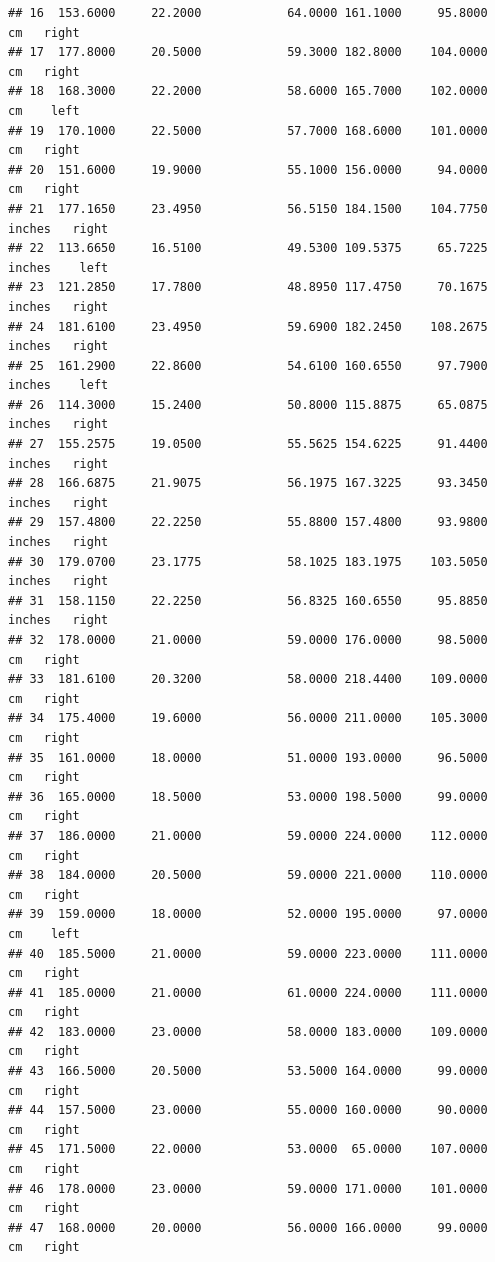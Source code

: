 \documentclass[]{article}
\begin{document}
\begin{verbatim}
## 16  153.6000     22.2000            64.0000 161.1000     95.8000     cm   right
## 17  177.8000     20.5000            59.3000 182.8000    104.0000     cm   right
## 18  168.3000     22.2000            58.6000 165.7000    102.0000     cm    left
## 19  170.1000     22.5000            57.7000 168.6000    101.0000     cm   right
## 20  151.6000     19.9000            55.1000 156.0000     94.0000     cm   right
## 21  177.1650     23.4950            56.5150 184.1500    104.7750 inches   right
## 22  113.6650     16.5100            49.5300 109.5375     65.7225 inches    left
## 23  121.2850     17.7800            48.8950 117.4750     70.1675 inches   right
## 24  181.6100     23.4950            59.6900 182.2450    108.2675 inches   right
## 25  161.2900     22.8600            54.6100 160.6550     97.7900 inches    left
## 26  114.3000     15.2400            50.8000 115.8875     65.0875 inches   right
## 27  155.2575     19.0500            55.5625 154.6225     91.4400 inches   right
## 28  166.6875     21.9075            56.1975 167.3225     93.3450 inches   right
## 29  157.4800     22.2250            55.8800 157.4800     93.9800 inches   right
## 30  179.0700     23.1775            58.1025 183.1975    103.5050 inches   right
## 31  158.1150     22.2250            56.8325 160.6550     95.8850 inches   right
## 32  178.0000     21.0000            59.0000 176.0000     98.5000     cm   right
## 33  181.6100     20.3200            58.0000 218.4400    109.0000     cm   right
## 34  175.4000     19.6000            56.0000 211.0000    105.3000     cm   right
## 35  161.0000     18.0000            51.0000 193.0000     96.5000     cm   right
## 36  165.0000     18.5000            53.0000 198.5000     99.0000     cm   right
## 37  186.0000     21.0000            59.0000 224.0000    112.0000     cm   right
## 38  184.0000     20.5000            59.0000 221.0000    110.0000     cm   right
## 39  159.0000     18.0000            52.0000 195.0000     97.0000     cm    left
## 40  185.5000     21.0000            59.0000 223.0000    111.0000     cm   right
## 41  185.0000     21.0000            61.0000 224.0000    111.0000     cm   right
## 42  183.0000     23.0000            58.0000 183.0000    109.0000     cm   right
## 43  166.5000     20.5000            53.5000 164.0000     99.0000     cm   right
## 44  157.5000     23.0000            55.0000 160.0000     90.0000     cm   right
## 45  171.5000     22.0000            53.0000  65.0000    107.0000     cm   right
## 46  178.0000     23.0000            59.0000 171.0000    101.0000     cm   right
## 47  168.0000     20.0000            56.0000 166.0000     99.0000     cm   right

\end{verbatim}
\end{document}
